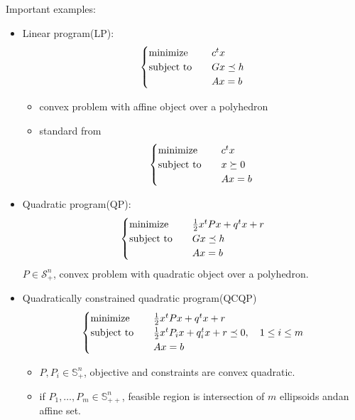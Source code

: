 \begin{remark}
    Important examples:
    \begin{itemize}
        \item Linear program(LP):
            \[\begin{cases}
                \operatorname{minimize} \quad &c^tx\\
                \operatorname{subject\ to} \quad &Gx \preceq h\\
                &Ax = b
            \end{cases}\]
            \begin{itemize}
                \item convex problem with affine object over a polyhedron
                \item standard from \[\begin{cases}
                    \operatorname{minimize} \quad &c^tx\\
                    \operatorname{subject\ to} \quad &x \succeq 0\\
                    &Ax = b
                \end{cases}\]
            \end{itemize}
        \item Quadratic program(QP):
            \[\begin{cases}
                \operatorname{minimize} \quad &\frac{1}{2}x^tPx + q^tx + r\\
                \operatorname{subject\ to} \quad &Gx \preceq h\\
                &Ax = b
            \end{cases}\]
            $P \in \mathcal{S}_{+}^n$, convex problem with quadratic object over a polyhedron.
        \item Quadratically constrained quadratic program(QCQP)
            \[\begin{cases}
                \operatorname{minimize} \quad &\frac{1}{2}x^tPx + q^tx + r\\
                \operatorname{subject\ to} \quad &\frac{1}{2}x^tP_ix + q_i^tx + r \preceq 0,\quad 1 \le i \le m\\
                &Ax = b
            \end{cases}\]
            \begin{itemize}
                \item $P, P_i \in \mathbb{S}_+^n$, objective and constraints are convex quadratic.
                \item if $P_1, \dots, P_m \in \mathbb{S}_{++}^n$, feasible region is intersection of $m$ ellipsoids andan affine set.
            \end{itemize}
    \end{itemize}
\end{remark}

